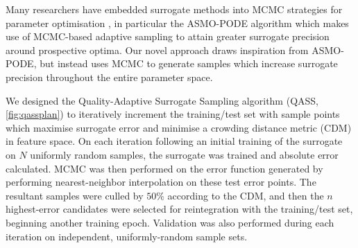 Many researchers have embedded surrogate methods into MCMC strategies for
parameter optimisation \cite{Zhang2020,Gong2017}, in particular the ASMO-PODE
algorithm \cite{Ginting2011} which makes use of MCMC-based adaptive sampling to
attain greater surrogate precision around prospective optima. Our novel approach
draws inspiration from ASMO-PODE, but instead uses MCMC to generate samples
which increase surrogate precision throughout the entire parameter space.


We designed the Quality-Adaptive Surrogate Sampling algorithm (QASS,
\cref{fig:qassplan}) to iteratively increment the training/test set with sample
points which maximise surrogate error and minimise a crowding distance metric
(CDM) \cite{Solonen2012} in feature space. On each iteration following an initial training of the surrogate on $N$ uniformly random samples, the surrogate was trained and absolute error calculated. MCMC was then performed on the error function generated by performing nearest-neighbor interpolation on these test error points. The resultant samples were culled by $50\%$ according to the CDM, and then the $n$ highest-error candidates were selected for reintegration with the training/test set, beginning another training epoch. Validation was also performed during each iteration on independent, uniformly-random sample sets.




